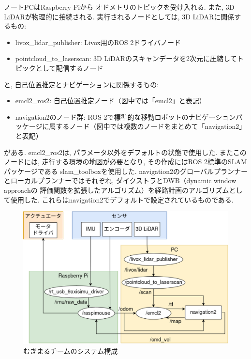 ノートPCはRaspberry Piから
オドメトリのトピックを受け入れる. 
また, 3D LiDARが物理的に接続される. 
実行されるノードとしては, 3D LiDARに関係するもの: 
\begin{itemize}
	\item livox\_lidar\_publisher: Livox用のROS 2ドライバノード
	\item pointcloud\_to\_laserscan: 3D LiDARのスキャンデータを2次元に圧縮してトピックとして配信するノード
\end{itemize}
と, 自己位置推定とナビゲーションに関係するもの: 
\begin{itemize}
	\item emcl2\_ros2: 自己位置推定ノード（図中では「emcl2」と表記）
	\item navigation2\cite{nav2}のノード群: ROS 2で標準的な移動ロボットのナビゲーションパッケージに属するノード（図中では複数のノードをまとめて「navigation2」と表記）
\end{itemize}
がある. 
emcl2\_ros2は, パラメータ以外をデフォルトの状態で使用した. 
またこのノードには, 走行する環境の地図が必要となり, 
その作成にはROS 2標準のSLAMパッケージである
slam\_toolbox\cite{slam_toolbox}を使用した. 
navigation2のグローバルプランナーとローカルプランナーではそれぞれ, 
ダイクストラ\cite{dijkstra}とDWB（dynamic window approach\cite{dwa}の
評価関数を拡張したアルゴリズム）を経路計画のアルゴリズムとして使用した. 
これらはnavigation2でデフォルトで設定されているものである. 

\begin{figure}[h]
  \begin{center}
    \includegraphics[width=1.0\linewidth]{figs/mugimaru_system_2024.eps}
    \caption{むぎまるチームのシステム構成}
    \label{fig:mugimaru_system}
  \end{center}
\end{figure}

